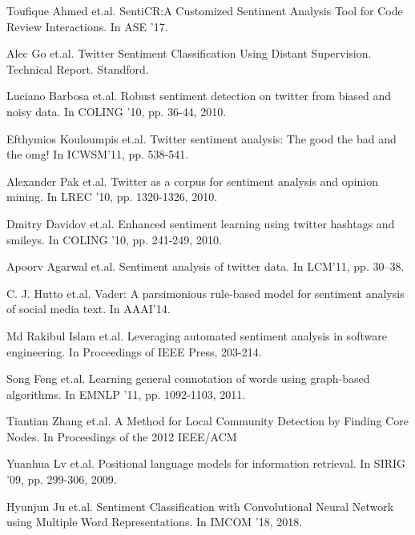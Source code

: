 \documentclass[runningheads]{llncs}
\begin{document}
\begin{thebibliography}{8}
Toufique Ahmed et.al.
\newblock SentiCR:A Customized Sentiment Analysis Tool for Code Review Interactions.
\newblock In ASE ’17.

Alec Go et.al.
\newblock Twitter Sentiment Classification Using Distant Supervision.
\newblock Technical Report. Standford.

Luciano Barbosa et.al.
\newblock Robust sentiment detection on twitter from biased and noisy data.
\newblock In COLING ’10, pp. 36-44, 2010.

Efthymios Kouloumpis et.al.
\newblock Twitter sentiment analysis: The good the bad and the omg!
\newblock In ICWSM’11, pp. 538-541.

Alexander Pak et.al.
\newblock Twitter as a corpus for sentiment analysis and opinion mining.
\newblock In LREC ’10, pp. 1320-1326, 2010.

Dmitry Davidov et.al.
\newblock Enhanced sentiment learning using twitter hashtags and smileys.
\newblock In COLING ’10, pp. 241-249, 2010.

Apoorv Agarwal et.al.
\newblock Sentiment analysis of twitter data.
\newblock In LCM’11, pp. 30–38.

C. J. Hutto et.al.
\newblock Vader: A parsimonious rule-based model for sentiment analysis of social media text.
\newblock In AAAI’14.

Md Rakibul Islam et.al.
\newblock Leveraging automated sentiment analysis in software engineering. 
\newblock In Proceedings of IEEE Press, 203-214.

Song Feng et.al.
\newblock Learning general connotation of words using graph-based algorithms.
\newblock In EMNLP ’11, pp. 1092-1103, 2011.

Tiantian Zhang et.al.
\newblock A Method for Local Community Detection by Finding Core Nodes. 
\newblock In Proceedings of the 2012 IEEE/ACM 

Yuanhua Lv et.al.
\newblock Positional language models for information retrieval.
\newblock In SIRIG ’09, pp. 299-306, 2009.

Hyunjun Ju et.al.
\newblock Sentiment Classification with Convolutional Neural Network using Multiple Word Representations.
\newblock In IMCOM ’18, 2018.


\end{thebibliography}
\end{document}
